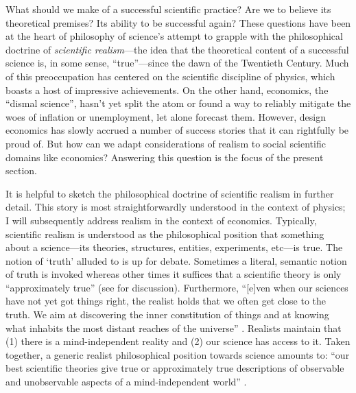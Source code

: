 
What should we make of a successful scientific practice? Are we to believe its theoretical premises? Its ability to be successful again? These questions have been at the heart of philosophy of science's attempt to grapple with the philosophical doctrine of \textit{scientific realism}---the idea that the theoretical content of a successful science is, in some sense, ``true''---since the dawn of the Twentieth Century. Much of this preoccupation has centered on the scientific discipline of physics, which boasts a host of impressive achievements. On the other hand, economics, the ``dismal science'', hasn't yet split the atom or found a way to reliably mitigate the woes of inflation or unemployment, let alone forecast them. However, design economics has slowly accrued a number of success stories that it can rightfully be proud of. But how can we adapt considerations of realism to social scientific domains like economics? Answering this question is the focus of the present section.

It is helpful to sketch the philosophical doctrine of scientific realism in further detail. This story is most straightforwardly understood in the context of physics; I will subsequently address realism in the context of economics. Typically, scientific realism is understood as the philosophical position that something about a science---its theories, structures, entities, experiments, etc---is true. The notion of `truth' alluded to is up for debate. Sometimes a literal, semantic notion of truth is invoked whereas other times it suffices that a scientific theory is only ``approximately true'' (see \cite{chakravartty2017} for discussion). Furthermore, ``[e]ven when our sciences have not yet got things right, the realist holds that we often get close to the truth. We aim at discovering the inner constitution of things and at knowing what inhabits the most distant reaches of the universe'' \autocite[21]{hacking1983}. Realists maintain that (1) there is a mind-independent reality and (2) our science has access to it. Taken together, a generic realist philosophical position towards science amounts to: ``our best scientific theories give true or approximately true descriptions of observable and unobservable aspects of a mind-independent world'' \autocite[\S 1.2]{chakravartty2017}.

